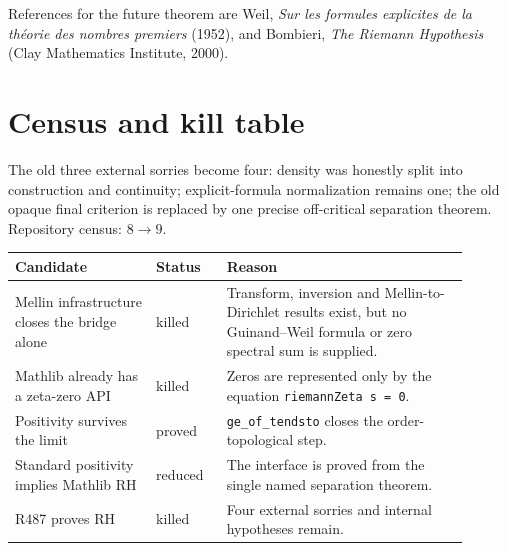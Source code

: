 \documentclass[11pt]{article}
\newcommand{\code}[1]{\nolinkurl{#1}}
\begin{document}
References for the future theorem are Weil, \emph{Sur les formules
explicites de la théorie des nombres premiers} (1952), and Bombieri,
\emph{The Riemann Hypothesis} (Clay Mathematics Institute, 2000).

\section{Census and kill table}

The old three external sorries become four: density was honestly split
into construction and continuity; explicit-formula normalization remains
one; the old opaque final criterion is replaced by one precise
off-critical separation theorem.  Repository census: \(8\to9\).

\begin{center}
\small
\begin{tabular}{p{0.28\linewidth}p{0.14\linewidth}p{0.48\linewidth}}
\hline
Candidate & Status & Reason\\ \hline
Mellin infrastructure closes the bridge alone & killed & Transform,
inversion and Mellin-to-Dirichlet results exist, but no Guinand--Weil
formula or zero spectral sum is supplied.\\
Mathlib already has a zeta-zero API & killed & Zeros are represented only
by the equation \code{riemannZeta s = 0}.\\
Positivity survives the limit & proved & \code{ge_of_tendsto} closes the
order-topological step.\\
Standard positivity implies Mathlib RH & reduced & The interface is
proved from the single named separation theorem.\\
R487 proves RH & killed & Four external sorries and internal hypotheses
remain.\\ \hline
\end{tabular}
\end{center}
\end{document}
